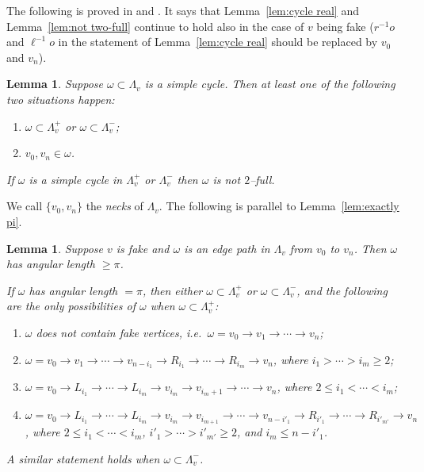 \documentclass[11pt]{amsart}
\newtheorem{lemma}[theorem]{Lemma}
\theoremstyle{definition}
\newcommand{\lemfivesixteen}{Lemma 5.15}
\newcommand{\lemfiveseventeen}{Lemma 5.16}
\newcommand{\lemfivenineteen}{Lemma 5.18}
\begin{document}
The following is proved in \cite[\lemfivesixteen]{Artinmetric} and \cite[\lemfiveseventeen]{Artinmetric}.
It says that
Lemma~\ref{lem:cycle real} and Lemma~\ref{lem:not two-full} continue to hold also in the case of $v$ being fake ($r^{-1}o$ and $\ell^{-1}o$ in the statement of Lemma~\ref{lem:cycle real} should be replaced by $v_0$ and $v_n$).
\begin{lemma}
	\label{lem:not two-full1}
	Suppose $\omega\subset \Lambda_v$ is a simple cycle. Then at least one of the following two situations happen:
	\begin{enumerate}
		\item $\omega\subset\Lambda^+_v$ or $\omega\subset\Lambda^-_v$;
		\item $v_0,v_n\in\omega$.
	\end{enumerate} 
	If $\omega$ is a simple cycle in $\Lambda^+_v$ or $\Lambda^-_v$ then $\omega$ is not $2$--full.		
\end{lemma}

We call $\{v_0,v_n\}$ the \emph{necks} of $\Lambda_v$.
The following is parallel to Lemma~\ref{lem:exactly pi}.

\begin{lemma} 	\cite[\lemfivenineteen]{Artinmetric}
	\label{lem:exactly pi1}
Suppose $v$ is fake and $\omega$ is an edge path in $\Lambda_v$ from $v_0$ to $v_n$. Then $\omega$ has angular length $\ge\pi$.

	
If $\omega$ has angular length $=\pi$, then either $\omega\subset\Lambda^+_v$ or $\omega\subset\Lambda^-_v$, and the following are the only possibilities of $\omega$ when $\omega\subset\Lambda^+_v$:
	\begin{enumerate}
		\item $\omega$ does not contain fake vertices, i.e.\ $\omega=v_0\to v_1\to\cdots\to v_n$;
		\item $\omega=v_0\to v_1\to\cdots\to v_{n-i_1}\to R_{i_1}\to\cdots \to R_{i_m}\to v_n$, where $i_1>\cdots>i_m\ge2$;
		\item $\omega=v_0\to L_{i_1}\to\cdots\to L_{i_m}\to v_{i_m}\to v_{i_m+1}\to\cdots \to v_n$, where $2\le i_1<\cdots< i_m$;
		\item $\omega=v_0\to L_{i_1}\to\cdots\to L_{i_m}\to v_{i_m}\to v_{i_{m+1}}\to\cdots \to v_{n-i'_1}\to R_{i'_1}\to\cdots \to R_{i'_{m'}}\to v_n$, where $2\le i_1<\cdots<i_m$, $i'_{1}>\cdots>i'_{m'}\ge 2$, and $i_m\le n-i'_1$.
	\end{enumerate}
	A similar statement holds when $\omega\subset\Lambda^-_v$.
\end{lemma}
\end{document}
